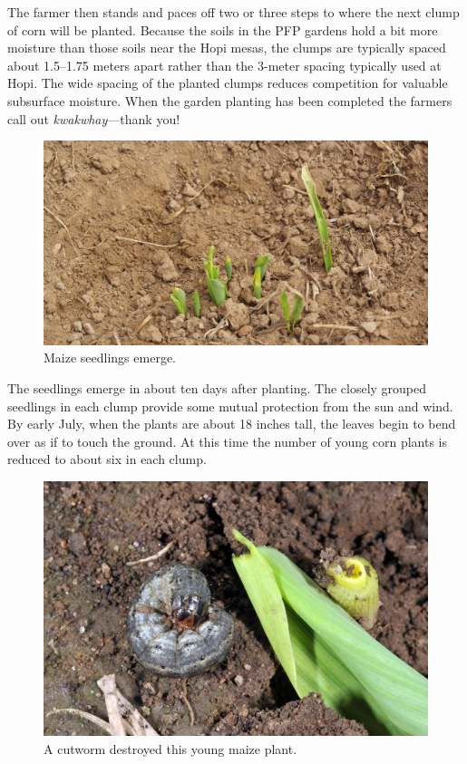 \documentclass[12pt,]{article}
\begin{document}
The farmer then stands and paces off two or three steps to where the next clump of corn will be planted. Because the soils in the PFP gardens hold a bit more moisture than those soils near the Hopi mesas, the clumps are typically spaced about 1.5--1.75 meters apart rather than the 3-meter spacing typically used at Hopi. The wide spacing of the planted clumps reduces competition for valuable subsurface moisture. When the garden planting has been completed the farmers call out \emph{kwakwhay}---thank you!

\begin{figure}
\centering
\includegraphics{./images/chapter_6_emergence.jpg}
\caption{Maize seedlings emerge.}
\end{figure}

The seedlings emerge in about ten days after planting. The closely grouped seedlings in each clump provide some mutual protection from the sun and wind. By early July, when the plants are about 18 inches tall, the leaves begin to bend over as if to touch the ground. At this time the number of young corn plants is reduced to about six in each clump.

\begin{figure}
\centering
\includegraphics{./images/chapter_6_cutworms.jpg}
\caption{A cutworm destroyed this young maize plant.}
\end{figure}
\end{document}
